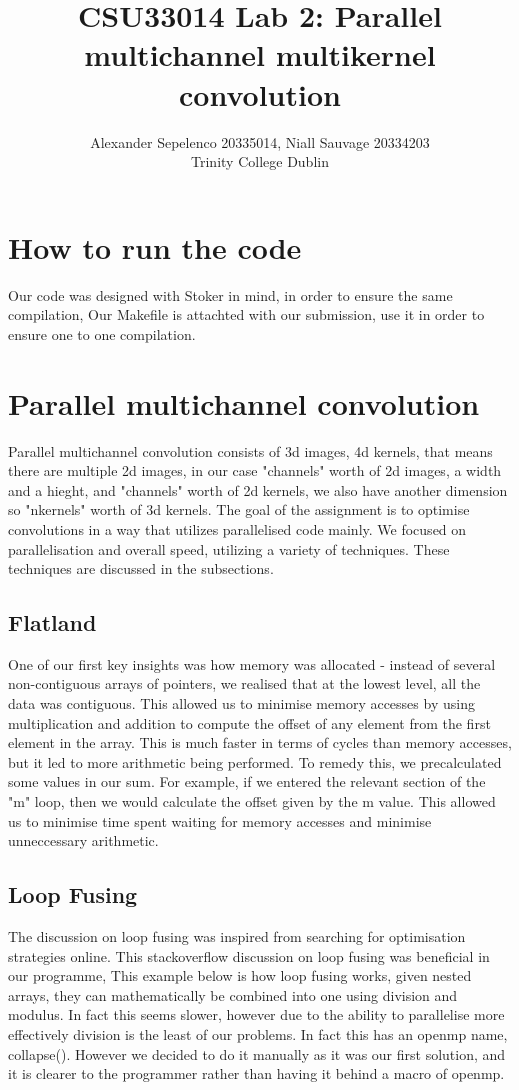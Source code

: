 \documentclass[12pt,fleqn,leqno,letterpaper]{article}
\title{CSU33014 Lab 2: Parallel multichannel multikernel convolution}
\author{Alexander Sepelenco 20335014, Niall Sauvage 20334203\\
  \small{Trinity College Dublin}
}
\begin{document}
\maketitle
\tableofcontents

\newpage    
\section{How to run the code}
Our code was designed with Stoker in mind, in order to ensure the
same compilation, Our Makefile is attachted with our submission, 
use it in order to ensure one to one compilation.

\section{Parallel multichannel convolution}
Parallel multichannel convolution consists of 3d images, 4d kernels, that means there
are multiple 2d images, in our case "channels" worth of 2d images, a width and a hieght, 
and "channels" worth of 2d kernels, we also have another dimension so "nkernels" worth of 3d kernels. 
The goal of the assignment is to optimise convolutions in a way that utilizes parallelised code mainly.
We focused on parallelisation and overall speed, utilizing a variety of techniques.
These techniques are discussed in the subsections.

\subsection{Flatland}
One of our first key insights was how memory was allocated - instead of several non-contiguous arrays of
pointers, we realised that at the lowest level, all the data was contiguous. This allowed us to minimise 
memory accesses by using multiplication and addition to compute the offset of any element from the first 
element in the array. This is much faster in terms of cycles than memory accesses, but it led to more 
arithmetic being performed. To remedy this, we precalculated some values in our sum. For example, if we
entered the relevant section of the "m" loop, then we would calculate the offset given by the m value. 
This allowed us to minimise time spent waiting for memory accesses and minimise unneccessary arithmetic.

\subsection{Loop Fusing}
The discussion on loop fusing was inspired from searching for optimisation strategies online.
This stackoverflow discussion on loop fusing was beneficial in our programme, 
This example below is how loop fusing works, given nested arrays, they can mathematically be combined into 
one using division and modulus. In fact this seems slower, however due to the ability to parallelise more
effectively division is the least of our problems. In fact this has an openmp name, collapse(). However 
we decided to do it manually as it was our first solution, and it is clearer to the programmer rather than
having it behind a macro of openmp.
\end{document}
